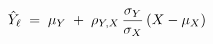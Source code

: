 \documentclass[preview]{standalone}
\begin{document}
\begin{align*}
\special{dvisvgm:raw <g id='unique000'>}\hat{Y}_\ell \;=\; \mu_Y \;+\; \rho_{Y\!,X}\,\frac{\sigma_Y}{\sigma_X}\,(X-\mu_X)\special{dvisvgm:raw </g>}
\end{align*}
\end{document}
